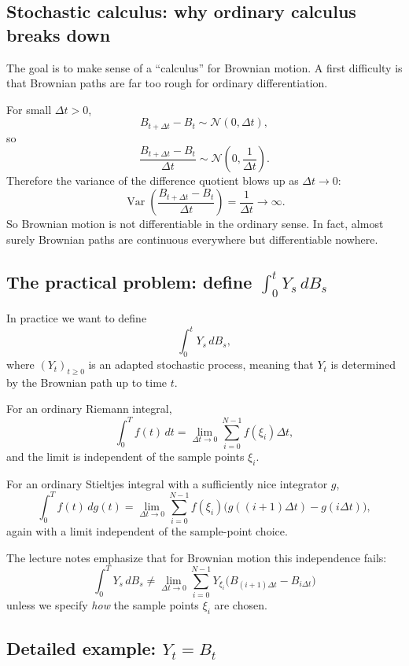 \documentclass[11pt]{article}
\theoremstyle{definition}
\begin{document}
\subsection{Stochastic calculus: why ordinary calculus breaks down}

The goal is to make sense of a ``calculus'' for Brownian motion. A first difficulty is that Brownian paths are far too rough for ordinary differentiation.

For small \(\Delta t>0\),
\[
B_{t+\Delta t}-B_t\sim \mathcal N(0,\Delta t),
\]
so
\[
\frac{B_{t+\Delta t}-B_t}{\Delta t}
\sim
\mathcal N\!\left(0,\frac{1}{\Delta t}\right).
\]
Therefore the variance of the difference quotient blows up as \(\Delta t\to 0\):
\[
\operatorname{Var}\!\left(\frac{B_{t+\Delta t}-B_t}{\Delta t}\right)=\frac{1}{\Delta t}\to\infty.
\]
So Brownian motion is not differentiable in the ordinary sense. In fact, almost surely Brownian paths are continuous everywhere but differentiable nowhere.

\subsection[The practical problem: define the stochastic integral]{The practical problem: define \texorpdfstring{$\int_0^t Y_s\,dB_s$}{the stochastic integral}}

In practice we want to define
\[
\int_0^t Y_s\,dB_s,
\]
where \((Y_t)_{t\ge 0}\) is an adapted stochastic process, meaning that \(Y_t\) is determined by the Brownian path up to time \(t\).

For an ordinary Riemann integral,
\[
\int_0^T f(t)\,dt
=
\lim_{\Delta t\to 0}
\sum_{i=0}^{N-1} f(\xi_i)\Delta t,
\]
and the limit is independent of the sample points \(\xi_i\).

For an ordinary Stieltjes integral with a sufficiently nice integrator \(g\),
\[
\int_0^T f(t)\,dg(t)
=
\lim_{\Delta t\to 0}
\sum_{i=0}^{N-1}
f(\xi_i)\bigl(g((i+1)\Delta t)-g(i\Delta t)\bigr),
\]
again with a limit independent of the sample-point choice.

The lecture notes emphasize that for Brownian motion this independence fails:
\[
\int_0^T Y_s\,dB_s
\neq
\lim_{\Delta t\to 0}
\sum_{i=0}^{N-1}
Y_{\xi_i}\bigl(B_{(i+1)\Delta t}-B_{i\Delta t}\bigr)
\]
unless we specify \emph{how} the sample points \(\xi_i\) are chosen.

\subsection[Detailed example: Yt = Bt]{Detailed example: \texorpdfstring{$Y_t=B_t$}{Yt = Bt}}
\end{document}
